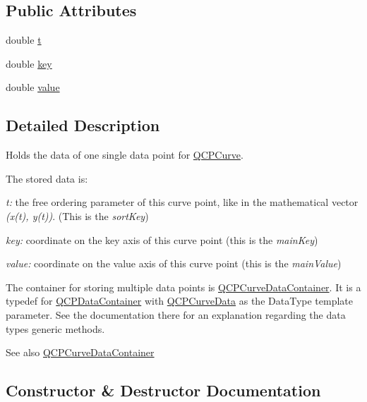 \subsection*{Public Attributes}
\begin{DoxyCompactItemize}
\item 
double \hyperlink{class_q_c_p_curve_data_aecc395525be28e9178a088793beb3ff3}{t}
\item 
double \hyperlink{class_q_c_p_curve_data_a8a4ec5f2b9a396149fd842e309701bd4}{key}
\item 
double \hyperlink{class_q_c_p_curve_data_a72b39b8e1dbf7b45382ebd48419b6828}{value}
\end{DoxyCompactItemize}


\subsection{Detailed Description}
Holds the data of one single data point for \hyperlink{class_q_c_p_curve}{Q\+C\+P\+Curve}. 

The stored data is\+: \begin{DoxyItemize}
\item {\itshape t\+:} the free ordering parameter of this curve point, like in the mathematical vector {\itshape (x(t), y(t))}. (This is the {\itshape sort\+Key}) \item {\itshape key\+:} coordinate on the key axis of this curve point (this is the {\itshape main\+Key}) \item {\itshape value\+:} coordinate on the value axis of this curve point (this is the {\itshape main\+Value})\end{DoxyItemize}
The container for storing multiple data points is \hyperlink{qcustomplot_8h_aaeee80d5664ea91beb9d7968790d0e65}{Q\+C\+P\+Curve\+Data\+Container}. It is a typedef for \hyperlink{class_q_c_p_data_container}{Q\+C\+P\+Data\+Container} with \hyperlink{class_q_c_p_curve_data}{Q\+C\+P\+Curve\+Data} as the Data\+Type template parameter. See the documentation there for an explanation regarding the data type\textquotesingle{}s generic methods.

\begin{DoxySeeAlso}{See also}
\hyperlink{qcustomplot_8h_aaeee80d5664ea91beb9d7968790d0e65}{Q\+C\+P\+Curve\+Data\+Container} 
\end{DoxySeeAlso}


\subsection{Constructor \& Destructor Documentation}
\mbox{\label{class_q_c_p_curve_data_a48252779b5198a509d99c69ae223fbf8}} 
